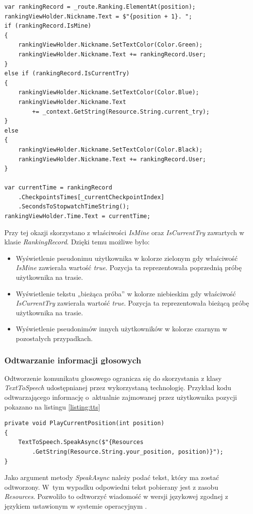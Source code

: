 \begin{lstlisting}[caption={Wyświetlanie rankingu},label=listing:adapter]
var rankingRecord = _route.Ranking.ElementAt(position);
rankingViewHolder.Nickname.Text = $"{position + 1}. ";
if (rankingRecord.IsMine)
{
    rankingViewHolder.Nickname.SetTextColor(Color.Green);
    rankingViewHolder.Nickname.Text += rankingRecord.User;
}
else if (rankingRecord.IsCurrentTry)
{
    rankingViewHolder.Nickname.SetTextColor(Color.Blue);
    rankingViewHolder.Nickname.Text 
    	+= _context.GetString(Resource.String.current_try);
}
else
{
    rankingViewHolder.Nickname.SetTextColor(Color.Black);
    rankingViewHolder.Nickname.Text += rankingRecord.User;
}

var currentTime = rankingRecord
	.CheckpointsTimes[_currentCheckpointIndex]
	.SecondsToStopwatchTimeString();
rankingViewHolder.Time.Text = currentTime;
\end{lstlisting}
Przy tej okazji skorzystano z właściwości \textit{IsMine} oraz \textit{IsCurrentTry} zawartych w klasie \textit{RankingRecord}. Dzięki temu możliwe było:
\begin{itemize}
\item{Wyświetlenie pseudonimu użytkownika w kolorze zielonym gdy właściwość \textit{IsMine} zawierała wartość \textit{true}. Pozycja ta reprezentowała poprzednią próbę użytkownika na trasie.}
\item{Wyświetlenie tekstu  „bieżąca próba” w kolorze niebieskim gdy właściwość \textit{IsCurrentTry} zawierała wartość \textit{true}. Pozycja ta reprezentowała bieżącą próbę użytkownika na trasie.} 
\item{Wyświetlenie pseudonimów innych użytkowników w kolorze czarnym w pozostałych przypadkach}.
\end{itemize}

\subsubsection{Odtwarzanie informacji głosowych}
Odtworzenie komunikatu głosowego ogranicza się do skorzystania z klasy \textit {TextToSpeech} udostępnianej przez wykorzystaną technologię. Przykład kodu odtwarzającego informację o~aktualnie zajmowanej przez użytkownika pozycji pokazano na listingu \ref{listing:tts}
\begin{lstlisting}[caption={Odtworzenie informacji głosowej o aktualnie zajmowanej pozycji},label=listing:tts]
private void PlayCurrentPosition(int position)
{
    TextToSpeech.SpeakAsync($"{Resources
    	.GetString(Resource.String.your_position, position)}");
}
\end{lstlisting}
Jako argument metody \textit{SpeakAsync} należy podać tekst, który ma zostać odtworzony. W~tym wypadku odpowiedni tekst pobierany jest z zasobu \textit{Resources}. Pozwoliło to odtworzyć wiadomość w wersji językowej zgodnej z językiem ustawionym w systemie operacyjnym \cite{resources}.

